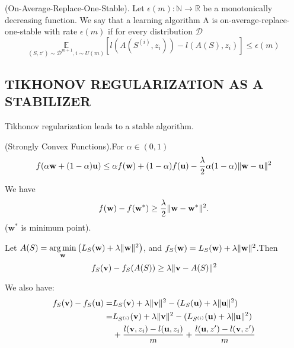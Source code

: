 \begin{defn}
	(On-Average-Replace-One-Stable).
	Let $ \epsilon(m): \mathbb{N} \rightarrow \mathbb{R} $ be a monotonically decreasing function.
	We say that a learning algorithm A is on-average-replace-one-stable with rate $ \epsilon(m) $
	if for every distribution $ \mathcal{D} $
	\begin{equation}
		\underset{(S,z') \sim \mathcal{D}^{m+1}, i \sim U(m)} {\mathbb{E}}
		[l(A(S^{(i)}, z_i)) - l(A(S), z_i)] \le \epsilon(m)
	\end{equation}
\end{defn}

\subsection{TIKHONOV REGULARIZATION AS A STABILIZER}

Tikhonov regularization leads to a stable algorithm.
\begin{defn} (Strongly Convex Functions).For $ \alpha \in (0, 1) $
	\begin{equation}
		f( \alpha \mathbf{w} + (1-\alpha) \mathbf{u}) \le
		\alpha f(\mathbf{w}) + (1-\alpha) f(\mathbf{u})
		- \frac{\lambda}{2} \alpha (1-\alpha) \Arrowvert \mathbf{w} - \mathbf{u} \Arrowvert^2
	\end{equation}
\end{defn}

We have
\[ f(\mathbf{w}) - f(\mathbf{w}^*) \ge \frac{\lambda}{2} \Arrowvert \mathbf{w} - \mathbf{w}^* \Arrowvert^2.\]
($\mathbf{w}^*$ is minimum point).

Let $ A(S) = \underset{\mathbf{w}}{\arg\min} \left( L_S(\mathbf{w}) + \lambda \Arrowvert \mathbf{w} \Arrowvert^2 \right) $,
and $ f_S(\mathbf{w}) = L_S(\mathbf{w}) + \lambda \Arrowvert \mathbf{w} \Arrowvert^2 $.Then
\begin{equation}
	\label{equ_13_7}
	f_S(\mathbf{v}) - f_S(A(S)) \ge \lambda \Arrowvert \mathbf{v} - A(S) \Arrowvert^2
\end{equation}

We also have:
\begin{equation}
	\begin{aligned}
		f_S(\mathbf{v}) - f_S(\mathbf{u}) =&
		L_S(\mathbf{v}) + \lambda \Arrowvert \mathbf{v} \Arrowvert^2 
		- (L_S(\mathbf{u})+\lambda \Arrowvert \mathbf{u} \Arrowvert^2) \\
		=& L_{S^{(i)}}(\mathbf{v}) + \lambda \Arrowvert \mathbf{v} \Arrowvert^2 
		- (L_{S^{(i)}}(\mathbf{u}) + \lambda \Arrowvert \mathbf{u} \Arrowvert^2) \\
		 & + \frac{l(\mathbf{v}, z_i)-l(\mathbf{u}, z_i)}{m}
		 + \frac{l(\mathbf{u}, z') - l(\mathbf{v}, z')}{m}
	\end{aligned}
\end{equation}

